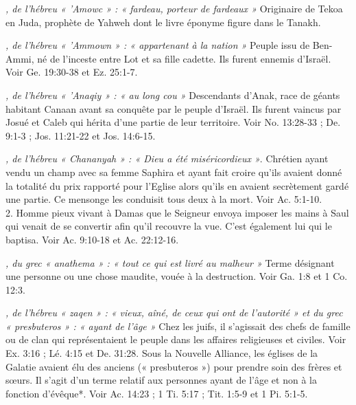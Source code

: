 \begin{multicols}{2}
\textit{, de l'hébreu « 'Amowc » : « fardeau, porteur de fardeaux »}\newline
Originaire de Tekoa en Juda, prophète de Yahweh dont le livre éponyme figure dans le Tanakh.

\textit{, de l'hébreu « 'Ammown » : « appartenant à la nation »}\newline
Peuple issu de Ben-Ammi, né de l'inceste entre Lot et sa fille cadette. Ils furent ennemis d'Israël. Voir Ge. 19:30-38 et Ez. 25:1-7.

\textit{, de l'hébreu « 'Anaqiy » : « au long cou »}\newline
Descendants d'Anak, race de géants habitant Canaan avant sa conquête par le peuple d'Israël. Ils furent vaincus par Josué et Caleb qui hérita d'une partie de leur territoire. Voir No. 13:28-33 ; De. 9:1-3 ; Jos. 11:21-22 et Jos. 14:6-15.

\textit{, de l'hébreu « Chananyah » : « Dieu a été miséricordieux »}. Chrétien ayant vendu un champ avec sa femme Saphira et ayant fait croire qu'ils avaient donné la totalité du prix rapporté pour l'Eglise alors qu'ils en avaient secrètement gardé une partie. Ce mensonge les conduisit tous deux à la mort. Voir Ac. 5:1-10.
\\2. Homme pieux vivant à Damas que le Seigneur envoya imposer les mains à Saul qui venait de se convertir afin qu'il recouvre la vue. C'est également lui qui le baptisa. Voir Ac. 9:10-18 et Ac. 22:12-16.

\textit{, du grec « anathema » : « tout ce qui est livré au malheur »}\newline
Terme désignant une personne ou une chose maudite, vouée à la destruction. Voir Ga. 1:8 et 1 Co. 12:3.

\textit{, de l'hébreu « zaqen » : « vieux, aîné, de ceux qui ont de l'autorité » et du grec « presbuteros » : « ayant de l'âge »}\newline
Chez les juifs, il s'agissait des chefs de famille ou de clan qui représentaient le peuple dans les affaires religieuses et civiles. Voir Ex. 3:16 ; Lé. 4:15 et De. 31:28. Sous la Nouvelle Alliance, les églises de la Galatie avaient élu des anciens (« presbuteros ») pour prendre soin des frères et sœurs. Il s'agit d'un terme relatif aux personnes ayant de l'âge et non à la fonction d'évêque*. Voir Ac. 14:23 ; 1 Ti. 5:17 ; Tit. 1:5-9 et 1 Pi. 5:1-5.


\end{multicols}
